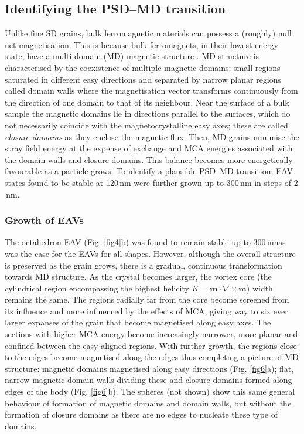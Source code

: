 \documentclass[review,authoryear]{elsarticle}
\newcommand{\nm}{\,\text{nm}}
\begin{document}
\subsection{Identifying the PSD--MD transition}
Unlike fine SD grains, bulk ferromagnetic materials can possess a (roughly) null net magnetisation. This is because bulk ferromagnets, in their lowest energy state, have a multi-domain (MD) magnetic structure \citep{Dunlop}. MD structure is characterised by the coexistence of multiple magnetic domains: small regions saturated in different easy directions and separated by narrow planar regions called domain walls where the magnetisation vector transforms continuously from the direction of one domain to that of its neighbour. Near the surface of a bulk sample the magnetic domains lie in directions parallel to the surfaces, which do not necessarily coincide with the magnetocrystalline easy axes; these are called \textit{closure domains} as they enclose the magnetic flux. Then, MD grains minimise the stray field energy at the expense of exchange and MCA energies associated with the domain walls and closure domains. This balance becomes more energetically favourable as a particle grows. To identify a plausible PSD--MD transition, EAV states found to be stable at 120$\nm$ were further grown up to 300$\nm$ in steps of 2$\nm$.\par

\subsubsection{Growth of EAVs}
The octahedron EAV (Fig. \ref{fig4}b) was found to remain stable up to 300$\nm${\textemdash}as was the case for the EAVs for all shapes. However, although the overall structure is preserved as the grain grows, there is a gradual, continuous transformation towards MD structure. As the crystal becomes larger, the vortex core (the cylindrical region encompassing the highest helicity $K=\boldsymbol{m}\cdot\nabla\times\boldsymbol{m}$) width remains the same. The regions radially far from the core become screened from its influence and more influenced by the effects of MCA, giving way to six ever larger expanses of the grain that become magnetised along easy axes. The sections with higher MCA energy become increasingly narrower, more planar and confined between the easy-aligned regions. With further growth, the regions close to the edges become magnetised along the edges thus completing a picture of MD structure: magnetic domains magnetised along easy directions (Fig. \ref{fig6}a); flat, narrow magnetic domain walls dividing these and closure domains formed along edges of the body (Fig. \ref{fig6}b). The spheres (not shown) show this same general behaviour of formation of magnetic domains and domain walls, but without the formation of closure domains as there are no edges to nucleate these type of domains.\par
\end{document}
